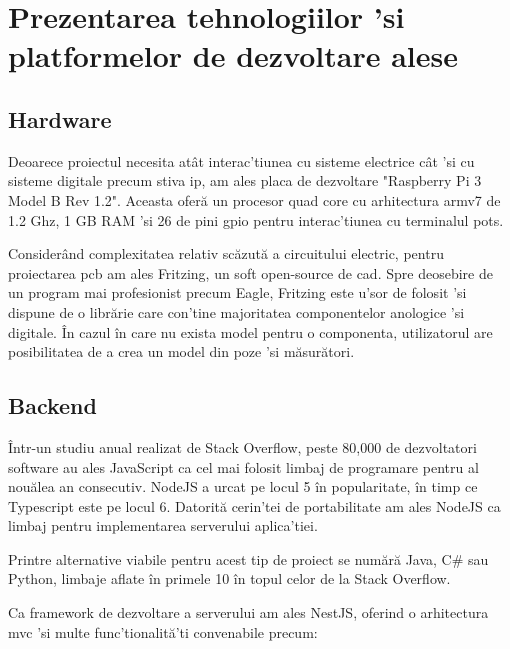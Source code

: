 \section {Prezentarea tehnologiilor 'si platformelor de dezvoltare alese}

\subsection {Hardware}

Deoarece proiectul necesita atât interac'tiunea cu sisteme electrice cât 'si cu sisteme digitale precum stiva \acrshort{ip}, am ales placa de dezvoltare "Raspberry Pi 3 Model B Rev 1.2". Aceasta oferă un procesor quad core cu arhitectura armv7 de 1.2 Ghz, 1 GB RAM 'si 26 de pini \acrfull{gpio} pentru interac'tiunea cu terminalul \acrshort{pots}.

Considerând complexitatea relativ scăzută a circuitului electric, pentru proiectarea \acrshort{pcb} am ales Fritzing, un soft open-source de \acrfull{cad}. Spre deosebire de un program mai profesionist precum Eagle, Fritzing este u'sor de folosit 'si dispune de o librărie care con'tine majoritatea componentelor anologice 'si digitale. În cazul în care nu exista model pentru o componenta, utilizatorul are posibilitatea de a crea un model din poze 'si măsurători. 

\subsection {Backend}

Într-un studiu anual realizat de Stack Overflow, peste 80,000 de dezvoltatori software au ales JavaScript ca cel mai folosit limbaj de programare pentru al nouălea an consecutiv. NodeJS a urcat pe locul 5 în popularitate, în timp ce Typescript este pe locul 6. Datorită cerin'tei de portabilitate am ales NodeJS ca limbaj pentru implementarea serverului aplica'tiei. \cite{StackOverflow2021Survey}

Printre alternative viabile pentru acest tip de proiect se numără Java, C\# sau Python, limbaje aflate în primele 10 în topul celor de la Stack Overflow.

Ca framework de dezvoltare a serverului am ales NestJS, oferind o arhitectura \acrfull{mvc} 'si multe func'tionalită'ti convenabile precum:

